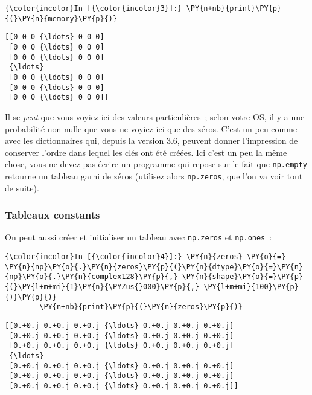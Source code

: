     \begin{Verbatim}[commandchars=\\\{\},frame=single,framerule=0.3mm,rulecolor=\color{cellframecolor}]
{\color{incolor}In [{\color{incolor}3}]:} \PY{n+nb}{print}\PY{p}{(}\PY{n}{memory}\PY{p}{)}
\end{Verbatim}


    \begin{Verbatim}[commandchars=\\\{\},frame=single,framerule=0.3mm,rulecolor=\color{cellframecolor}]
[[0 0 0 {\ldots} 0 0 0]
 [0 0 0 {\ldots} 0 0 0]
 [0 0 0 {\ldots} 0 0 0]
 {\ldots}
 [0 0 0 {\ldots} 0 0 0]
 [0 0 0 {\ldots} 0 0 0]
 [0 0 0 {\ldots} 0 0 0]]
\end{Verbatim}

    Il se \emph{peut} que vous voyiez ici des valeurs particulières~; selon
votre OS, il y a une probabilité non nulle que vous ne voyiez ici que
des zéros. C'est un peu comme avec les dictionnaires qui, depuis la
version 3.6, peuvent donner l'impression de conserver l'ordre dans
lequel les clés ont été créées. Ici c'est un peu la même chose, vous ne
devez pas écrire un programme qui repose sur le fait que
\texttt{np.empty} retourne un tableau garni de zéros (utilisez alors
\texttt{np.zeros}, que l'on va voir tout de suite).

    \hypertarget{tableaux-constants}{%
\subsubsection{Tableaux constants}\label{tableaux-constants}}

    On peut aussi créer et initialiser un tableau avec \texttt{np.zeros} et
\texttt{np.ones}~:

    \begin{Verbatim}[commandchars=\\\{\},frame=single,framerule=0.3mm,rulecolor=\color{cellframecolor}]
{\color{incolor}In [{\color{incolor}4}]:} \PY{n}{zeros} \PY{o}{=} \PY{n}{np}\PY{o}{.}\PY{n}{zeros}\PY{p}{(}\PY{n}{dtype}\PY{o}{=}\PY{n}{np}\PY{o}{.}\PY{n}{complex128}\PY{p}{,} \PY{n}{shape}\PY{o}{=}\PY{p}{(}\PY{l+m+mi}{1}\PY{n}{\PYZus{}000}\PY{p}{,} \PY{l+m+mi}{100}\PY{p}{)}\PY{p}{)}
        \PY{n+nb}{print}\PY{p}{(}\PY{n}{zeros}\PY{p}{)}
\end{Verbatim}


    \begin{Verbatim}[commandchars=\\\{\},frame=single,framerule=0.3mm,rulecolor=\color{cellframecolor}]
[[0.+0.j 0.+0.j 0.+0.j {\ldots} 0.+0.j 0.+0.j 0.+0.j]
 [0.+0.j 0.+0.j 0.+0.j {\ldots} 0.+0.j 0.+0.j 0.+0.j]
 [0.+0.j 0.+0.j 0.+0.j {\ldots} 0.+0.j 0.+0.j 0.+0.j]
 {\ldots}
 [0.+0.j 0.+0.j 0.+0.j {\ldots} 0.+0.j 0.+0.j 0.+0.j]
 [0.+0.j 0.+0.j 0.+0.j {\ldots} 0.+0.j 0.+0.j 0.+0.j]
 [0.+0.j 0.+0.j 0.+0.j {\ldots} 0.+0.j 0.+0.j 0.+0.j]]
\end{Verbatim}

